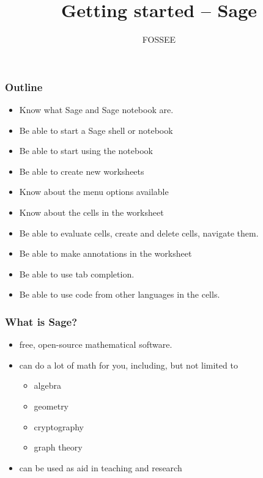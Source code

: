 \documentclass[presentation]{beamer}
\title{Getting started -- Sage}
\author{FOSSEE}
\date{}
\begin{document}
\maketitle









\begin{frame}
\frametitle{Outline}
\label{sec-1}

\begin{itemize}
\item Know what Sage and Sage notebook are.
\item Be able to start a Sage shell or notebook
\item Be able to start using the notebook
\item Be able to create new worksheets
\item Know about the menu options available
\item Know about the cells in the worksheet
\item Be able to evaluate cells, create and delete cells, navigate them.
\item Be able to make annotations in the worksheet
\item Be able to use tab completion.
\item Be able to use code from other languages in the cells.
\end{itemize}
\end{frame}
\begin{frame}
\frametitle{What is Sage?}
\label{sec-2}

\begin{itemize}
\item free, open-source mathematical software.
\item can do a lot of math for you, including, but not limited to

\begin{itemize}
\item algebra
\item geometry
\item cryptography
\item graph theory
\end{itemize}

\item can be used as aid in teaching and research
\end{itemize}
\end{frame}
\end{document}
